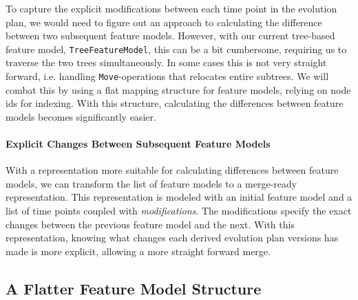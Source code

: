 \documentclass[a4paper,english]{ifimaster}
\begin{document}
To capture the explicit modifications between each time point in the evolution plan, we would need to figure out an approach to calculating the difference between two subsequent feature models. However, with our current tree-based feature model, \texttt{TreeFeatureModel}, this can be a bit cumbersome, requiring us to traverse the two trees simultaneously. In some cases this is not very straight forward, i.e. handling \texttt{Move}-operations that relocates entire subtrees. We will combat this by using a flat mapping structure for feature models, relying on node ids for indexing. With this structure, calculating the differences between feature models becomes significantly easier. 

\paragraph{Explicit Changes Between Subsequent Feature Models}%
\label{par:explicit_changes_between_subsequent_feature_models}

With a representation more suitable for calculating differences between feature models, we can transform the list of feature models to a merge-ready representation. This representation is modeled with an initial feature model and a list of time points coupled with \textit{modifications}. The modifications specify the exact changes between the previous feature model and the next. With this representation, knowing what changes each derived evolution plan versions has made is more explicit, allowing a more straight forward merge.



\subsection{A Flatter Feature Model Structure}%
\label{sub:a_flatter_feature_model_structure}
\end{document}
